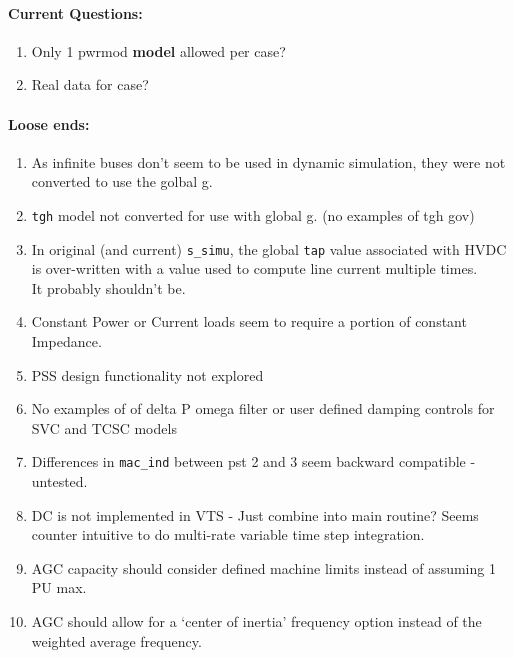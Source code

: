 \documentclass[12pt]{article}
\begin{document}
\begin{multicols}{2}
	

\vfill\null
\columnbreak




\paragraph{Current Questions:}
	\begin{enumerate}
	\itemsep0em 
	
	\item Only 1 pwrmod \textbf{model} allowed per case?
	\item Real data for case?
	
	\end{enumerate}	

\paragraph{Loose ends:} %
	\begin{enumerate}
	 em
	\item As infinite buses don't seem to be used in dynamic simulation, they were not converted to use the golbal g.
		\item \verb|tgh| model not converted for use with global g. (no examples of tgh gov)
		\item In original (and current) \verb|s_simu|, the global \verb|tap| value associated with HVDC is over-written with  a value used to compute line current multiple times. \\It probably shouldn't be.
		\item Constant Power or Current loads seem to require a portion of constant Impedance.
		\item PSS design functionality not explored
		\item No examples of of delta P omega filter or user defined damping controls for SVC and TCSC models
		\item Differences in \verb|mac_ind| between pst 2 and 3 seem backward compatible - untested.
		\item DC is not implemented in VTS - Just combine into main routine? Seems counter intuitive to do multi-rate variable time step integration.
		\item AGC capacity should consider defined machine limits instead of assuming 1 PU max.
		\item AGC should allow for a `center of inertia' frequency option instead of the weighted average frequency.
	\end{enumerate}
	

\end{multicols}
\end{document}
